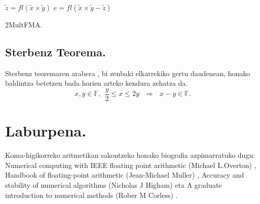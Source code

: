 \begin{algorithm}[H]
 \BlankLine
 {$\tilde{z}=fl(\tilde{x}\times\tilde{y})$\;
  $e=fl(\tilde{x}\times\tilde{y}- \tilde{z})$\;
 }
 \BlankLine
 \caption{2MultFMA.}
\end{algorithm}

\subsection*{Sterbenz Teorema.}
Sterbenz teoremaren arabera \cite{Sterbenz1973}, bi zenbaki elkarrekiko  gertu daudenean, honako baldintza betetzen bada horien arteko kendura zehatza da.
\begin{equation}
\label{eq:4311}
x,y \in \mathbb{F}, \ \ \frac{y}{2}\leq x \leq 2y \ \ \ \Rightarrow \ \ \ x-y\in \mathbb{F}.
\end{equation}


\section{Laburpena.}

Koma-higikorreko aritmetikan sakontzeko honako biografia azpimarratuko dugu: Numerical computing with IEEE floating point arithmetic (Michael L.Overton) \cite{Overton2001}, Handbook of floating-point arithmetic (Jean-Michael Muller) \cite{Muller2009}, Accuracy and stability of numerical algorithms (Nicholas J Higham) \cite{Higham2002} eta A graduate introduction to numerical methods (Rober M Corless) \cite{Corless2013}.


